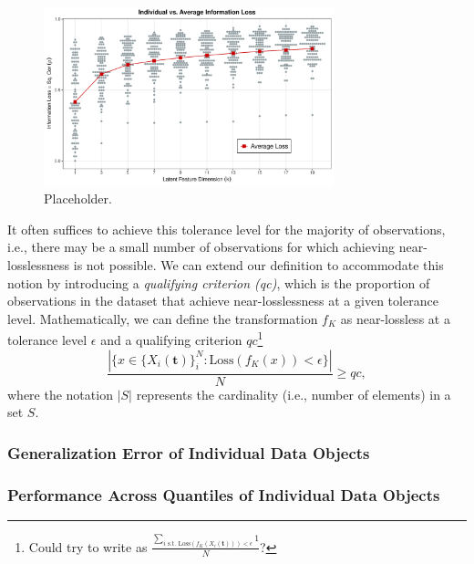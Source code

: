 {\begin{figure}
    \centering
    \includegraphics[width=0.75\textwidth]{figures/info-loss.pdf}
    \caption{Placeholder.}
    \label{fig:ind-losses}
\end{figure}
\newline
It often suffices to achieve this tolerance level for the majority of observations, i.e., there may be a small number of observations for which achieving near-losslessness is not possible. We can extend our definition to accommodate this notion by introducing a \emph{qualifying criterion (qc)}, which is the proportion of observations in the dataset that achieve near-losslessness at a given tolerance level.
Mathematically, we can define the transformation $f_K$ as near-lossless at a tolerance level $\epsilon$ and a qualifying criterion $qc$\footnote{Could try to write as $\frac{\sum_{i \text{ s.t. } \text{Loss} \left( f_K(X_i(\mathbf{t})) \right) < \epsilon }1}{N}$?}
$$
\frac{| \{x \in \{X_i(\mathbf{t})\}_{i}^N : \text{Loss} \left( f_K(x) \right) < \epsilon \} |} 
{N}
\geq qc,
$$
where the notation $|S|$ represents the cardinality (i.e., number of elements) in a set $S$.}
\subsubsection{Generalization Error of Individual Data Objects}
\subsubsection{Performance Across Quantiles of Individual Data Objects}